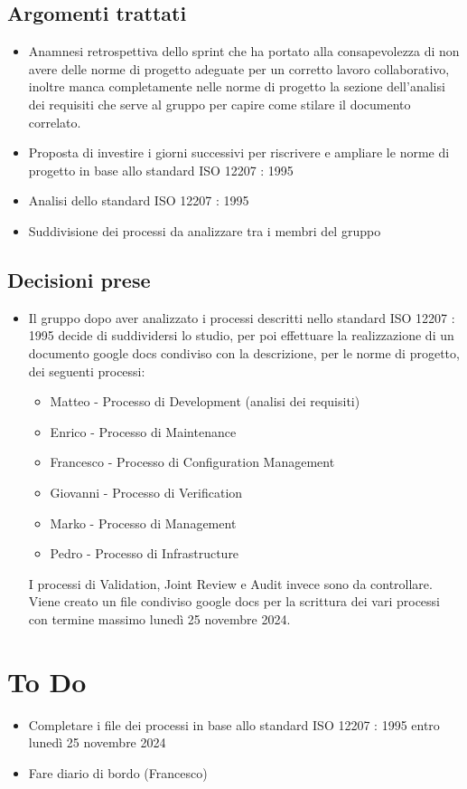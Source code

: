 \documentclass[a4paper, 12pt]{article}
\begin{document}
\subsection{Argomenti trattati}
\begin{itemize}
    \item Anamnesi retrospettiva dello sprint che ha portato alla consapevolezza di non avere delle norme di progetto adeguate per un corretto lavoro collaborativo, inoltre manca completamente nelle norme di progetto la sezione dell'analisi dei requisiti che serve al gruppo per capire come stilare il documento correlato.
    \item Proposta di investire i giorni successivi per riscrivere e ampliare le norme di progetto in base allo standard ISO 12207 : 1995
    \item Analisi dello standard ISO 12207 : 1995
    \item Suddivisione dei processi da analizzare tra i membri del gruppo
\end{itemize}

\subsection{Decisioni prese}
\begin{itemize}
    \item Il gruppo dopo aver analizzato i processi descritti nello standard ISO 12207 : 1995 decide di suddividersi lo studio, per poi effettuare la realizzazione di un documento google docs condiviso con la descrizione, per le norme di progetto, dei seguenti processi:
    \begin{itemize}
        \item Matteo - Processo di Development (analisi dei requisiti)
        \item Enrico - Processo di Maintenance
        \item Francesco - Processo di Configuration Management
        \item Giovanni - Processo di Verification
        \item Marko - Processo di Management
        \item Pedro - Processo di Infrastructure
    \end{itemize}
    I processi di Validation, Joint Review e Audit invece sono da controllare.
    Viene creato un file condiviso google docs per la scrittura dei vari processi con termine massimo lunedì 25 novembre 2024.
\end{itemize}

\section{To Do}
    \begin{itemize}
        \item Completare i file dei processi in base allo standard ISO 12207 : 1995 entro lunedì 25 novembre 2024
        \item Fare diario di bordo (Francesco)
    \end{itemize}
\end{document}
